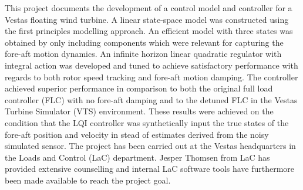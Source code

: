 \abstract
\noindent This project documents the development of a control model and controller for a Vestas floating wind turbine. A linear state-space model was constructed using the first principles modelling approach. An efficient model with three states was obtained by only including components which were relevant for capturing the fore-aft motion dynamics. An infinite horizon linear quadratic regulator with integral action was developed and tuned to achieve satisfactory performance with regards to both rotor speed tracking and fore-aft motion damping. The controller achieved superior performance in comparison to both the original full load controller (FLC) with no fore-aft damping and to the detuned FLC in the Vestas Turbine Simulator (VTS) environment. These results were achieved on the condition that the LQI controller was synthetically input the true states of the fore-aft position and velocity in stead of estimates derived from the noisy simulated sensor. The project has been carried out at the Vestas headquarters in the Loads and Control (LaC) department. Jesper Thomsen from LaC has provided extensive counselling and internal LaC software tools have furthermore been made available to reach the project goal.